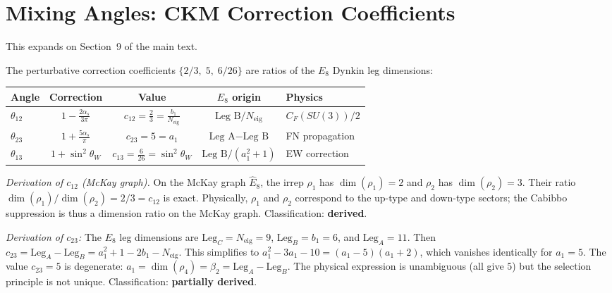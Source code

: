 \documentclass[12pt,a4paper]{article}
\theoremstyle{definition}
\begin{document}
\section{Mixing Angles: CKM Correction Coefficients}
\label{sec:S-mixing}

This expands on Section~9 of the main text.

The perturbative correction coefficients $\{2/3,\; 5,\; 6/26\}$ are ratios of the $E_8$ Dynkin leg dimensions:

\begin{center}
\begin{tabular}{lcccl}
\toprule
\textbf{Angle} & \textbf{Correction} & \textbf{Value} & \textbf{$E_8$ origin} & \textbf{Physics} \\
\midrule
$\theta_{12}$ & $1 - \frac{2\alpha_s}{3\pi}$ & $c_{12} = \frac{2}{3} = \frac{b_1}{N_{\text{eig}}}$ & $\text{Leg~B} / N_{\text{eig}}$ & $C_F(SU(3))/2$ \\[4pt]
$\theta_{23}$ & $1 + \frac{5\alpha_s}{\pi}$ & $c_{23} = 5 = a_1$ & $\text{Leg~A} - \text{Leg~B}$ & FN propagation \\[4pt]
$\theta_{13}$ & $1 + \sin^2\theta_W$ & $c_{13} = \frac{6}{26} = \sin^2\theta_W$ & $\text{Leg~B}/(a_1^2+1)$ & EW correction \\
\bottomrule
\end{tabular}
\end{center}

\textit{Derivation of $c_{12}$ (McKay graph).}  On the McKay graph $\hat{E}_8$, the irrep $\rho_1$ has $\dim(\rho_1) = 2$ and $\rho_2$ has $\dim(\rho_2) = 3$.  Their ratio $\dim(\rho_1)/\dim(\rho_2) = 2/3 = c_{12}$ is exact.  Physically, $\rho_1$ and $\rho_2$ correspond to the up-type and down-type sectors; the Cabibbo suppression is thus a dimension ratio on the McKay graph.  Classification: \textbf{derived}.

\textit{Derivation of $c_{23}$:} The $E_8$ leg dimensions are $\text{Leg}_C = N_{\text{eig}} = 9$, $\text{Leg}_B = b_1 = 6$, and $\text{Leg}_A = 11$.  Then $c_{23} = \text{Leg}_A - \text{Leg}_B = a_1^2 + 1 - 2b_1 - N_{\text{eig}}$.  This simplifies to $a_1^2 - 3a_1 - 10 = (a_1-5)(a_1+2)$, which vanishes identically for $a_1 = 5$.  The value $c_{23} = 5$ is degenerate: $a_1 = \dim(\rho_4) = \beta_2 = \text{Leg}_A - \text{Leg}_B$.  The physical expression is unambiguous (all give $5$) but the selection principle is not unique.  Classification: \textbf{partially derived}.
\end{document}
